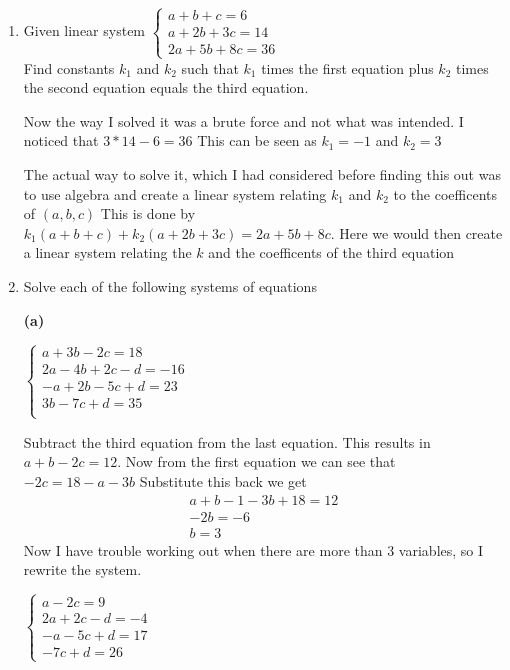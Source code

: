 \documentclass[10pt]{article}
\begin{document}
\begin{enumerate}
        \vspace{1em}
        \item Given linear system
          $\begin{cases}
            a+b+c=6 \\
            a+2b+3c=14 \\
            2a+5b+8c=36
          \end{cases}$ \\[8pt]
          Find constants $k_1$ and $k_2$ such that $k_1$ times the first equation plus $k_2$ times the second equation equals the third equation.


          Now the way I solved it was a brute force and not what was intended. I noticed that $3*14-6=36$ This can be seen as $k_1=-1$ and $k_2=3$

          The actual way to solve it, which I had considered before finding this out was to use algebra and create a linear system relating $k_1$ and $k_2$ to the coefficents of $(a,b,c)$
          This is done by $k_1(a+b+c)+k_2(a+2b+3c)=2a+5b+8c$. Here we would then create a linear system relating the $k$ and the coefficents of the third equation  \newpage
        \item Solve each of the following systems of equations 


          \textbf{(a)}
          \begin{minipage}[t]{0.5\linewidth}
            $\begin{cases}
              a+3b-2c=18 \\
              2a-4b+2c-d=-16 \\
              -a+2b-5c+d=23 \\
              3b-7c+d=35 \\
            \end{cases}$
            
            Subtract the third equation from the last equation. This results in $a+b-2c=12$. Now from the first equation we can see that $-2c=18-a-3b$
            Substitute this back we get  
            \begin{align}
              a+b-1-3b+18=12 \\
              -2b=-6 \\
              b=3
            \end{align}
            Now I have trouble working out when there are more than 3 variables, so I rewrite the system.


            $\begin{cases}
              a-2c=9 \\
              2a+2c-d=-4 \\
              -a-5c+d=17 \\
              -7c+d=26
            \end{cases}$\\[6pt]


\end{minipage}
\end{enumerate}
\end{document}
